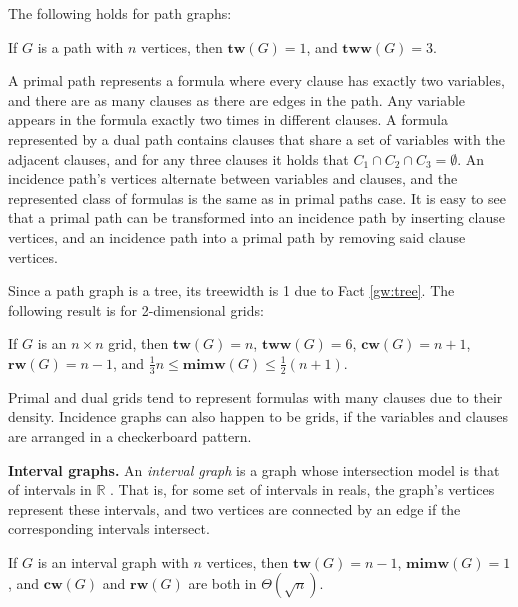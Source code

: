 The following holds for path graphs:
\begin{fact}
	If $G$ is a path with $n$ vertices, then $\mathbf{tw}(G)=1$, and $\mathbf{tww}(G) = 3$.
\end{fact}

\noindent
{\color{lightgray} A primal path represents a formula where every clause has exactly two variables, and there are as many clauses as there are edges in the path.
Any variable appears in the formula exactly two times in different clauses.
A formula represented by a dual path contains clauses that share a set of variables with the adjacent clauses, and for any three clauses it holds that $C_1 \cap C_2 \cap C_3 = \emptyset$.
An incidence path's vertices alternate between variables and clauses, and the represented class of formulas is the same as in primal paths case.
It is easy to see that a primal path can be transformed into an incidence path by inserting clause vertices, and an incidence path into a primal path by removing said clause vertices.}

Since a path graph is a tree, its treewidth is 1 due to Fact \ref{gw:tree}.
The following result is for 2-dimensional grids:
\begin{fact}
	If $G$ is an $n \times n$ grid, then $\mathbf{tw}(G) = n$, $\mathbf{tww}(G) = 6$, $\mathbf{cw}(G) = n + 1$, $\mathbf{rw}(G) = n - 1$, and $ \frac{1}{3}n \leq \mathbf{mimw}(G) \leq \frac{1}{2} (n+1)$.
\end{fact}

\noindent
{\color{lightgray} Primal and dual grids tend to represent formulas with many clauses due to their density.
Incidence graphs can also happen to be grids, if the variables and clauses are arranged in a checkerboard pattern.}

\textbf{Interval graphs.}
An {\em interval graph} is a graph whose intersection model is that of intervals in $\mathbb{R}$ \cite{DBLP:conf/sat/SaetherTV14}.
That is, for some set of intervals in reals, the graph's vertices represent these intervals, and two vertices are connected by an edge if the corresponding intervals intersect.

\begin{fact}
	If $G$ is an interval graph with $n$ vertices, then $\mathbf{tw}(G) = n - 1$, $\mathbf{mimw}(G) = 1$, and $\mathbf{cw}(G)$ and $\mathbf{rw}(G)$ are both in $\Theta(\sqrt{n})$.
\end{fact}

